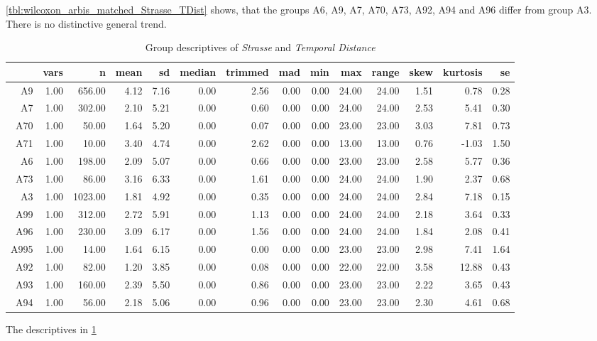\cref{tbl:wilcoxon_arbis_matched_Strasse_TDist} shows, that the groups A6, A9, A7, A70, A73, A92, A94 and A96 differ from group A3. There is no distinctive general trend.
\begin{table}[ht!]
	\tiny
	\centering
  \begin{tabular}{rrrrrrrrrrrrrr}
    \hline
    & vars & n & mean & sd & median & trimmed & mad & min & max & range & skew & kurtosis & se \\ 
    \hline
    A9   & 1.00 & 656.00 & 4.12 & 7.16 & 0.00 & 2.56 & 0.00 & 0.00 & 24.00 & 24.00 & 1.51 & 0.78 & 0.28 \\ 
    A7   & 1.00 & 302.00 & 2.10 & 5.21 & 0.00 & 0.60 & 0.00 & 0.00 & 24.00 & 24.00 & 2.53 & 5.41 & 0.30 \\ 
    A70  & 1.00 & 50.00 & 1.64 & 5.20 & 0.00 & 0.07 & 0.00 & 0.00 & 23.00 & 23.00 & 3.03 & 7.81 & 0.73 \\ 
    A71  & 1.00 & 10.00 & 3.40 & 4.74 & 0.00 & 2.62 & 0.00 & 0.00 & 13.00 & 13.00 & 0.76 & -1.03 & 1.50 \\ 
    A6   & 1.00 & 198.00 & 2.09 & 5.07 & 0.00 & 0.66 & 0.00 & 0.00 & 23.00 & 23.00 & 2.58 & 5.77 & 0.36 \\ 
    A73  & 1.00 & 86.00 & 3.16 & 6.33 & 0.00 & 1.61 & 0.00 & 0.00 & 24.00 & 24.00 & 1.90 & 2.37 & 0.68 \\ 
    A3   & 1.00 & 1023.00 & 1.81 & 4.92 & 0.00 & 0.35 & 0.00 & 0.00 & 24.00 & 24.00 & 2.84 & 7.18 & 0.15 \\ 
    A99  & 1.00 & 312.00 & 2.72 & 5.91 & 0.00 & 1.13 & 0.00 & 0.00 & 24.00 & 24.00 & 2.18 & 3.64 & 0.33 \\ 
    A96  & 1.00 & 230.00 & 3.09 & 6.17 & 0.00 & 1.56 & 0.00 & 0.00 & 24.00 & 24.00 & 1.84 & 2.08 & 0.41 \\ 
    A995 & 1.00 & 14.00 & 1.64 & 6.15 & 0.00 & 0.00 & 0.00 & 0.00 & 23.00 & 23.00 & 2.98 & 7.41 & 1.64 \\ 
    A92  & 1.00 & 82.00 & 1.20 & 3.85 & 0.00 & 0.08 & 0.00 & 0.00 & 22.00 & 22.00 & 3.58 & 12.88 & 0.43 \\ 
    A93  & 1.00 & 160.00 & 2.39 & 5.50 & 0.00 & 0.86 & 0.00 & 0.00 & 23.00 & 23.00 & 2.22 & 3.65 & 0.43 \\ 
    A94  & 1.00 & 56.00 & 2.18 & 5.06 & 0.00 & 0.96 & 0.00 & 0.00 & 23.00 & 23.00 & 2.30 & 4.61 & 0.68 \\ 
    \hline
  \end{tabular}
	\caption{Group descriptives of \textit{Strasse} and \textit{Temporal Distance}}
	\label{tbl:descriptives_arbis_matched_Strasse_TDist}
\end{table}
The descriptives in \cref{tbl:descriptives_arbis_matched_Strasse_TDist}

